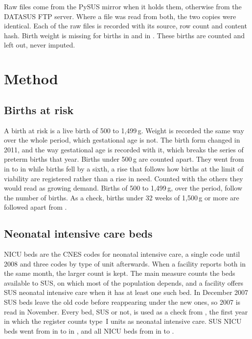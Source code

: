 \documentclass[11pt,a4paper]{article}
\begin{document}
Raw files come from the PySUS mirror when it holds them, otherwise from the
DATASUS FTP server. Where a file was read from both, the two copies were
identical. Each of the \rawFiles{} raw files is recorded with its source, row
count and content hash. Birth weight is missing for \weightMissingFirst{} births
in \firstYear{} and \weightMissingLast{} in \lastYear. These births are counted
and left out, never imputed.

\section{Method}

\subsection{Births at risk}
A birth at risk is a live birth of 500 to 1,499\,g. Weight is recorded the same
way over the whole period, which gestational age is not. The birth form changed
in 2011, and the way gestational age is recorded with it, which breaks the series
of preterm births that year. Births under 500\,g are counted apart. They went from
\underFiveFirst{} in \firstYear{} to \underFiveLast{} in \lastYear{} while births
fell by a sixth, a rise that follows how births at the limit of viability are
registered rather than a rise in need. Counted with the others they would read as
growing demand. Births of 500 to 1,499\,g, \riskTotal{} over the period, follow
the number of births. As a check, births under 32 weeks of 1,500\,g or more are
followed apart from \gestFirstYear.

\subsection{Neonatal intensive care beds}\label{sec:beds}
NICU beds are the CNES codes for neonatal intensive care, a single code until
2008 and three codes by type of unit afterwards. When a facility reports both in
the same month, the larger count is kept. The main measure counts the beds
available to SUS, on which most of the population depends, and a facility offers
SUS neonatal intensive care when it has at least one such bed. In December 2007
SUS beds leave the old code before reappearing under the new ones, so 2007 is
read in November. Every bed, SUS or not, is used as a check from \allBedsFrom,
the first year in which the register counts type~I units as neonatal intensive
care. SUS NICU beds went from \susBedsFirst{} in \firstYear{} to \susBedsLast{}
in \lastYear, and all NICU beds from \allBedsFirst{} in \allBedsFrom{} to
\allBedsLast.
\end{document}
